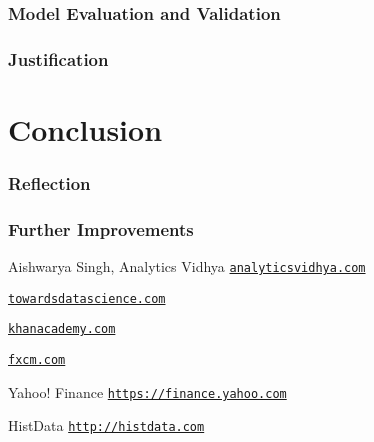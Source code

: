 \documentclass[a4paper,12pt]{article}
\begin{document}
\section{Model Evaluation and Validation}
\section{Justification}


\part{Conclusion}
\section{Reflection}
\section{Further Improvements}


\newpage
\begin{thebibliography}{15}
Aishwarya Singh, Analytics Vidhya
\texttt{\href{https://www.analyticsvidhya.com/blog/2018/10/predicting-stock-price-machine-learningnd-deep-learning-techniques-python/}{analyticsvidhya.com}}

\texttt{\href{https://towardsdatascience.com/machine-learning-techniques-applied-to-stock-price-prediction-6c1994da8001}{towardsdatascience.com}}

\texttt{\href{https://www.khanacademy.org/economics-finance-domain/core-finance/stock-and-bonds}{khanacademy.com}}

\texttt{\href{https://www.fxcm.com/uk/insights/learn-forex-oscillators-and-momentum-indicators/}{fxcm.com}}

Yahoo! Finance
\texttt{\url{https://finance.yahoo.com}}

HistData
\texttt{\url{http://histdata.com}}
\end{thebibliography}
\end{document}

